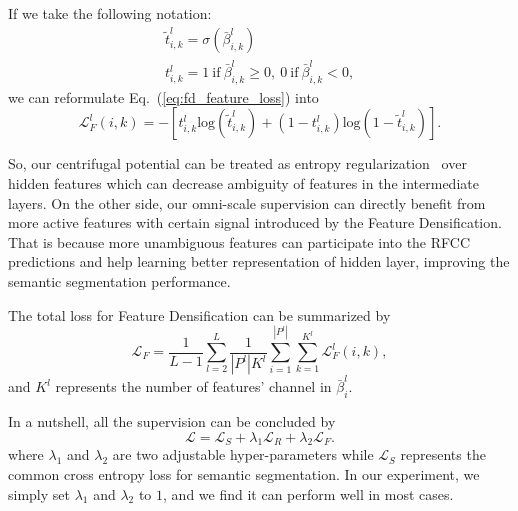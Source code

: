 \documentclass[final]{cvpr}
\begin{document}
If we take the following notation:
\begin{equation}
    \begin{array}{l}
    \tilde{t}_{i,k}^l = \sigma(\bar{\beta}_{i,k}^l)\\
    t_{i,k}^l = 
    1 ~\text{if}~\bar{\beta}_{i,k}^l \ge 0,~0 ~\text{if}~\bar{\beta}_{i,k}^l < 0 ,
    \end{array}
\end{equation}
we can reformulate Eq.~(\ref{eq:fd_feature_loss}) into
\begin{equation}
    \mathcal{L}_F^l(i,k) = -[t_{i,k}^l\text{log}(\tilde{t}_{i,k}^l) + (1-t_{i,k}^l)\text{log}(1-\tilde{t}_{i,k}^l)].
\end{equation}

So, our centrifugal potential can be treated as entropy regularization~\cite{lee2013pseudo} over hidden features which can decrease ambiguity of features in the intermediate layers. On the other side, our omni-scale supervision can directly benefit from more active features with certain signal introduced by the Feature Densification. That is because more unambiguous features can participate into the RFCC predictions and help learning better representation of hidden layer, improving the semantic segmentation performance.

The total loss for Feature Densification can be summarized by
\begin{equation}
\label{eq:fd_loss}
    \mathcal{L}_F = \frac{1}{L-1}\sum_{l=2}^L\frac{1}{|P^l|K^l}\sum_{i=1}^{|P^l|}\sum_{k=1}^{K^l} \mathcal{L}_F^l(i,k),
\end{equation}
and $K^l$ represents the number of features' channel in $\bar{\beta}_i^l$.

In a nutshell, all the supervision can be concluded by 
\begin{equation}
    \mathcal{L} = \mathcal{L}_S + \lambda_1 \mathcal{L}_R + \lambda_2 \mathcal{L}_F.
\end{equation}
where $\lambda_1$ and $\lambda_2$ are two adjustable hyper-parameters while $\mathcal{L}_S$ represents the common cross entropy loss for semantic segmentation. In our experiment, we simply set $\lambda_1$ and $\lambda_2$ to $1$, and we find it can perform well in most cases.
\end{document}
